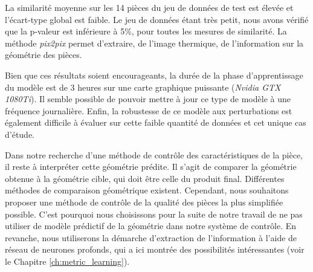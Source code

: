La similarité moyenne sur les 14 pièces du jeu de données de test est élevée et l'écart-type global est faible.
Le jeu de données étant très petit, nous avons vérifié que la p-valeur est inférieure à 5\%, pour toutes les mesures de similarité.
La méthode \textit{pix2pix} permet d'extraire, de l'image thermique, de l'information sur la géométrie des pièces.


Bien que ces résultats soient encourageants, la durée de la phase d'apprentissage du modèle est de 3 heures sur une carte graphique puissante (\textit{Nvidia GTX 1080Ti}).
Il semble possible de pouvoir mettre à jour ce type de modèle à une fréquence journalière.
Enfin, la robustesse de ce modèle aux perturbations est également difficile à évaluer sur cette faible quantité de données et cet unique cas d'étude.


Dans notre recherche d'une méthode de contrôle des caractéristiques de la pièce, il reste à interpréter cette géométrie prédite.
Il s'agit  de comparer la géométrie obtenue à la géométrie cible, qui doit être celle du produit final.
Différentes méthodes de comparaison géométrique existent.
Cependant, nous souhaitons proposer une méthode de contrôle de la qualité des pièces la plus simplifiée possible.
C'est pourquoi nous choisissons pour la suite de notre travail de ne pas utiliser de modèle prédictif de la géométrie dans notre système de contrôle.
En revanche, nous utiliserons la démarche d'extraction de l'information à l'aide de réseau de neurones profonds, qui a ici montrée des possibilités intéressantes (voir le Chapitre \ref{ch:metric_learning}).

